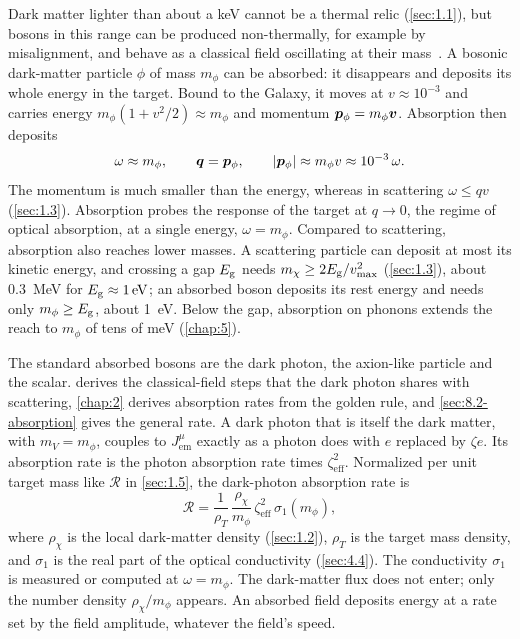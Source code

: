 Dark matter lighter than about a keV cannot be a thermal relic (\cref{sec:1.1}), but bosons in this range can be produced non-thermally, for example by misalignment, and behave as a classical field oscillating at their mass~\cite[Sect.~I\,B]{lin2019tasi}. A bosonic dark-matter particle $\phi$ of mass $m_\phi$ can be absorbed: it disappears and deposits its whole energy in the target. Bound to the Galaxy, it moves at $v \approx 10^{-3}$ and carries energy $m_\phi(1 + v^2/2) \approx m_\phi$ and momentum $\bm{p}_\phi = m_\phi\bm{v}$. Absorption then deposits
\begin{equation}
  \omega \approx m_\phi, \qquad \bm{q} = \bm{p}_\phi, \qquad |\bm{p}_\phi| \approx m_\phi v \approx 10^{-3}\,\omega .
  \label{eq:1.4-absorption}
\end{equation}
The momentum is much smaller than the energy, whereas in scattering $\omega \le qv$ (\cref{sec:1.3}). Absorption probes the response of the target at $q \to 0$, the regime of optical absorption, at a single energy, $\omega = m_\phi$. Compared to scattering, absorption also reaches lower masses. A scattering particle can deposit at most its kinetic energy, and crossing a gap $E_{\mathrm{g}}$ needs $m_\chi \ge 2E_{\mathrm{g}}/v_{\mathrm{max}}^2$ (\cref{sec:1.3}), about \SI{0.3}{MeV} for $E_{\mathrm{g}} \approx \SI{1}{eV}$; an absorbed boson deposits its rest energy and needs only $m_\phi \ge E_{\mathrm{g}}$, about \SI{1}{eV}. Below the gap, absorption on phonons extends the reach to $m_\phi$ of tens of meV (\cref{chap:5}).

The standard absorbed bosons are the dark photon, the axion-like particle and the scalar.  derives the classical-field steps that the dark photon shares with scattering, \cref{chap:2} derives absorption rates from the golden rule, and \cref{sec:8.2-absorption} gives the general rate. A dark photon that is itself the dark matter, with $m_V = m_\phi$, couples to $J^\mu_{\mathrm{em}}$ exactly as a photon does with $e$ replaced by $\zeta e$. Its absorption rate is the photon absorption rate times $\zeta_{\mathrm{eff}}^2$. Normalized per unit target mass like $\mathcal{R}$ in \cref{sec:1.5}, the dark-photon absorption rate is~\cite[Eq.~(7)]{hochberg2017absorption}
\begin{equation}
  \mathcal{R} = \frac{1}{\rho_T}\,\frac{\rho_\chi}{m_\phi}\,\zeta_{\mathrm{eff}}^2\,\sigma_1(m_\phi),
  \label{eq:1.4-dp-abs}
\end{equation}
where $\rho_\chi$ is the local dark-matter density (\cref{sec:1.2}), $\rho_T$ is the target mass density, and $\sigma_1$ is the real part of the optical conductivity (\cref{sec:4.4}). The conductivity $\sigma_1$ is measured or computed at $\omega = m_\phi$. The dark-matter flux does not enter; only the number density $\rho_\chi/m_\phi$ appears. An absorbed field deposits energy at a rate set by the field amplitude, whatever the field's speed.

